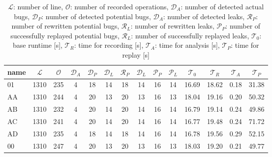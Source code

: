 \begin{table}[h]
\begin{tabular}{|l|c|c|c|c|c|c|c|c|c|c|c|c|c|}
\hline
name  & $\mathcal{L}$ & $\mathcal{O}$ & $\mathcal{D}_A$ & $\mathcal{D}_P$ & $\mathcal{D}_L$ & $\mathcal{R}_P$ & $\mathcal{D}_L$ & $\mathcal{P}_P$ & $\mathcal{P}_L$ & $\mathcal{T}_0$ & $\mathcal{T}_R$ & $\mathcal{T}_A$ & $\mathcal{T}_P$ \\ \hline
01 & 1310 & 235 & 4 & 18 & 14 & 18 & 14 & 16 & 14 & 16.69 & 18.62 & 0.18 & 31.38 \\ \hline
AA & 1310 & 244 & 4 & 20 & 13 & 20 & 13 & 16 & 13 & 18.04 & 19.16 & 0.20 & 50.32 \\ \hline
AB & 1310 & 232 & 4 & 20 & 14 & 20 & 14 & 16 & 14 & 16.79 & 19.14 & 0.24 & 49.86 \\ \hline
AC & 1310 & 241 & 4 & 20 & 14 & 20 & 14 & 16 & 14 & 16.77 & 19.48 & 0.24 & 71.72 \\ \hline
AD & 1310 & 235 & 4 & 18 & 14 & 18 & 14 & 16 & 14 & 16.78 & 19.56 & 0.29 & 52.15 \\ \hline
00 & 1310 & 247 & 4 & 20 & 13 & 20 & 13 & 16 & 13 & 18.03 & 19.20 & 0.21 & 49.77 \\ \hline
\end{tabular}
\caption{$\mathcal{L}$: number of line, $\mathcal{O}$: number of recorded operations, $\mathcal{D}_A$: number of detected actual bugs, $\mathcal{D}_P$: number of detected potential bugs, $\mathcal{D}_A$: number of detected leaks, $\mathcal{R}_P$: number of rewritten potential bugs, $\mathcal{R}_L$: number of rewritten leaks, $\mathcal{P}_P$: number of successfully replayed potential bugs, $\mathcal{R}_L$: number of successfully replayed leaks, $\mathcal{T}_0$: base runtime [s], $\mathcal{T}_R$: time for recording [s], $\mathcal{T}_A$: time for analysis [s], $\mathcal{T}_P$: time for replay [s]}
\label{}
\end{table}